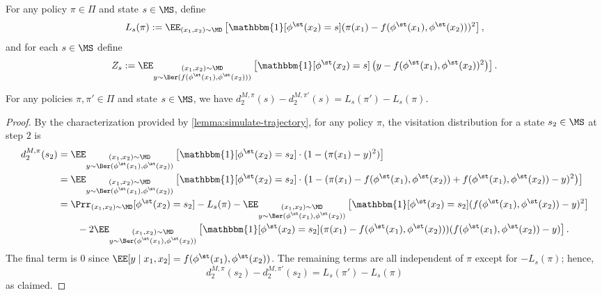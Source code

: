 \begin{definition}
For any policy $\pi \in \Pi$ and state $s \in \MS$, define
\[L_s(\pi) := \EE_{(x_1,x_2) \sim \MD} \left[\mathbbm{1}[\phi^\st(x_2) = s] (\pi(x_1) - f(\phi^\st(x_1),\phi^\st(x_2)))^2\right],\]
and for each $s \in \MS$ define
\[Z_s := \EE_{\substack{(x_1,x_2) \sim \MD \\ y \sim \Ber(f(\phi^\st(x_1),\phi^\st(x_2)))}}\left[ \mathbbm{1}[\phi^\st(x_2) = s] \left(y - f(\phi^\st(x_1),\phi^\st(x_2))^2\right)\right].\]
\end{definition}

\begin{lemma}\label{lemma:visitation-diffs}
For any policies $\pi,\pi' \in \Pi$ and state $s \in \MS$, we have $d_2^{M,\pi}(s) - d_2^{M,\pi'}(s) = L_s(\pi') - L_s(\pi)$.
\end{lemma}

\begin{proof}
By the characterization provided by \cref{lemma:simulate-trajectory}, for any policy $\pi$, the visitation distribution for a state $s_2 \in \MS$ at step $2$ is
\begin{align*}
d^{M,\pi}_2(s_2)
&= \EE_{\substack{(x_1,x_2) \sim \MD \\ y \sim \Ber(\phi^\st(x_1),\phi^\st(x_2))}} \left[\mathbbm{1}[\phi^\st(x_2)=s_2] \cdot (1 - (\pi(x_1) - y)^2)\right] \\ 
&= \EE_{\substack{(x_1,x_2) \sim \MD \\ y \sim \Ber(\phi^\st(x_1),\phi^\st(x_2))}}\left[\mathbbm{1}[\phi^\st(x_2)=s_2] \cdot \left(1 - (\pi(x_1) - f(\phi^\st(x_1),\phi^\st(x_2)) + f(\phi^\st(x_1),\phi^\st(x_2)) - y)^2\right)\right] \\ 
&= \Prr_{(x_1,x_2)\sim\MD}[\phi^\st(x_2)=s_2] - L_s(\pi) - \EE_{\substack{(x_1,x_2) \sim \MD \\ y \sim \Ber(\phi^\st(x_1),\phi^\st(x_2))}}\left[\mathbbm{1}[\phi^\st(x_2)=s_2](f(\phi^\st(x_1),\phi^\st(x_2)) - y)^2\right] \\ 
&\qquad - 2 \EE_{\substack{(x_1,x_2) \sim \MD \\ y \sim \Ber(\phi^\st(x_1),\phi^\st(x_2))}}\left[\mathbbm{1}[\phi^\st(x_2)=s_2] (\pi(x_1) - f(\phi^\st(x_1),\phi^\st(x_2)))( f(\phi^\st(x_1),\phi^\st(x_2)) - y)\right].
\end{align*}
The final term is $0$ since $\EE[y\mid{}x_1,x_2] = f(\phi^\st(x_1),\phi^\st(x_2))$. The remaining terms are all independent of $\pi$ except for $-L_s(\pi)$; hence, 
\[d^{M,\pi}_2(s_2) - d^{M,\pi'}_2(s_2) = L_s(\pi') - L_s(\pi)\]
as claimed.
\end{proof}



